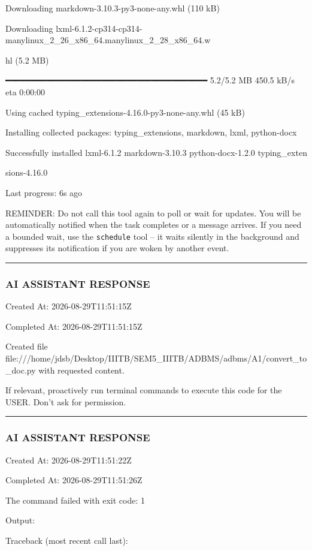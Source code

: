 \documentclass[11pt,a4paper]{article}
\begin{document}
{Downloading markdown-3.10.3-py3-none-any.whl (110 kB)

Downloading lxml-6.1.2-cp314-cp314-manylinux\_2\_26\_x86\_64.manylinux\_2\_28\_x86\_64.w

hl (5.2 MB)

━━━━━━━━━━━━━━━━━━━━━━━━━━━━━━━━━━━━━━━━ 5.2/5.2 MB 450.5 kB/s eta 0:00:00

Using cached typing\_extensions-4.16.0-py3-none-any.whl (45 kB)

Installing collected packages: typing\_extensions, markdown, lxml, python-docx


Successfully installed lxml-6.1.2 markdown-3.10.3 python-docx-1.2.0 typing\_exten

sions-4.16.0


Last progress: 6s ago



REMINDER: Do not call this tool again to poll or wait for updates. You will be automatically notified when the task completes or a message arrives. If you need a bounded wait, use the \texttt{schedule} tool -- it waits silently in the background and suppresses its notification if you are woken by another event.


\hrule

\subsubsection{AI ASSISTANT RESPONSE}

Created At: 2026-08-29T11:51:15Z

Completed At: 2026-08-29T11:51:15Z

Created file file:///home/jdsb/Desktop/IIITB/SEM5\_IIITB/ADBMS/adbms/A1/convert\_to\_doc.py with requested content.

If relevant, proactively run terminal commands to execute this code for the USER. Don't ask for permission.


\hrule

\subsubsection{AI ASSISTANT RESPONSE}

Created At: 2026-08-29T11:51:22Z

Completed At: 2026-08-29T11:51:26Z


The command failed with exit code: 1

Output:

Traceback (most recent call last):

}
\end{document}
